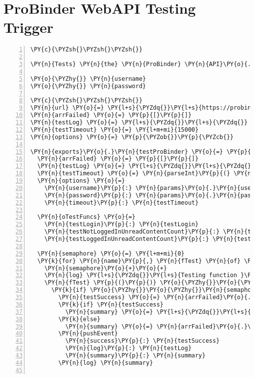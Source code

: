 \section{ProBinder WebAPI Testing Trigger\label{apipoller}}
\begin{Verbatim}[fontsize=\scriptsize,commandchars=\\\{\},numbers=left,firstnumber=1,stepnumber=1]
\PY{c}{\PYZsh{}\PYZsh{}\PYZsh{}}

\PY{n}{Tests} \PY{n}{the} \PY{n}{ProBinder} \PY{n}{API}\PY{o}{.} \PY{n}{Requires} \PY{n}{user} \PY{n}{credentials}\PY{p}{:}

\PY{o}{\PYZhy{}} \PY{n}{username}
\PY{o}{\PYZhy{}} \PY{n}{password}

\PY{c}{\PYZsh{}\PYZsh{}\PYZsh{}}
\PY{n}{url} \PY{o}{=} \PY{l+s}{\PYZdq{}}\PY{l+s}{https://probinder.com/service/}\PY{l+s}{\PYZdq{}}
\PY{n}{arrFailed} \PY{o}{=} \PY{p}{[}\PY{p}{]}
\PY{n}{testLog} \PY{o}{=} \PY{l+s}{\PYZdq{}}\PY{l+s}{\PYZdq{}}
\PY{n}{testTimeout} \PY{o}{=} \PY{l+m+mi}{15000}
\PY{n}{options} \PY{o}{=} \PY{p}{\PYZob{}}\PY{p}{\PYZcb{}}

\PY{n}{exports}\PY{o}{.}\PY{n}{testProBinder} \PY{o}{=} \PY{p}{(} \PY{n}{requestTimeoutMilliSeconds} \PY{p}{)} \PY{o}{\PYZhy{}}\PY{o}{\PYZgt{}}
  \PY{n}{arrFailed} \PY{o}{=} \PY{p}{[}\PY{p}{]}
  \PY{n}{testLog} \PY{o}{=} \PY{l+s}{\PYZdq{}}\PY{l+s}{\PYZdq{}}
  \PY{n}{testTimeout} \PY{o}{=} \PY{n}{parseInt}\PY{p}{(} \PY{n}{requestTimeoutMilliSeconds} \PY{p}{)} \PY{o}{|}\PY{o}{|} \PY{n}{testTimeout}
  \PY{n}{options} \PY{o}{=}
    \PY{n}{username}\PY{p}{:} \PY{n}{params}\PY{o}{.}\PY{n}{username}
    \PY{n}{password}\PY{p}{:} \PY{n}{params}\PY{o}{.}\PY{n}{password}
    \PY{n}{timeout}\PY{p}{:} \PY{n}{testTimeout}

  \PY{n}{oTestFuncs} \PY{o}{=}
    \PY{n}{testLogin}\PY{p}{:} \PY{n}{testLogin}
    \PY{n}{testNotLoggedInUnreadContentCount}\PY{p}{:} \PY{n}{testNotLoggedInUnreadContentCount}
    \PY{n}{testLoggedInUnreadContentCount}\PY{p}{:} \PY{n}{testLoggedInUnreadContentCount}

  \PY{n}{semaphore} \PY{o}{=} \PY{l+m+mi}{0}
  \PY{k}{for} \PY{n}{name}\PY{p}{,} \PY{n}{fTest} \PY{n}{of} \PY{n}{oTestFuncs}
    \PY{n}{semaphore}\PY{o}{+}\PY{o}{+}
    \PY{n}{log} \PY{l+s}{\PYZdq{}}\PY{l+s}{Testing function }\PY{l+s}{\PYZsq{}}\PY{l+s}{\PYZsh{}\PYZob{} name \PYZcb{}}\PY{l+s}{\PYZsq{}}\PY{l+s}{\PYZdq{}}
    \PY{n}{fTest} \PY{p}{(}\PY{p}{)} \PY{o}{\PYZhy{}}\PY{o}{\PYZgt{}}
      \PY{k}{if} \PY{o}{\PYZhy{}}\PY{o}{\PYZhy{}}\PY{n}{semaphore} \PY{o+ow}{is} \PY{l+m+mi}{0}
        \PY{n}{testSuccess} \PY{o}{=} \PY{n}{arrFailed}\PY{o}{.}\PY{n}{length} \PY{o+ow}{is} \PY{l+m+mi}{0}
        \PY{k}{if} \PY{n}{testSuccess}
          \PY{n}{summary} \PY{o}{=} \PY{l+s}{\PYZdq{}}\PY{l+s}{All tests passed!}\PY{l+s}{\PYZdq{}}
        \PY{k}{else}
          \PY{n}{summary} \PY{o}{=} \PY{n}{arrFailed}\PY{o}{.}\PY{n}{length} \PY{o}{+} \PY{l+s}{\PYZdq{}}\PY{l+s}{ test(s) failed: }\PY{l+s}{\PYZdq{}} \PY{o}{+} \PY{n}{arrFailed}\PY{o}{.}\PY{n}{join} \PY{l+s}{\PYZdq{}}\PY{l+s}{, }\PY{l+s}{\PYZdq{}}
        \PY{n}{pushEvent}
          \PY{n}{success}\PY{p}{:} \PY{n}{testSuccess} 
          \PY{n}{log}\PY{p}{:} \PY{n}{testLog}
          \PY{n}{summary}\PY{p}{:} \PY{n}{summary}
        \PY{n}{log} \PY{n}{summary} 


\end{Verbatim}
